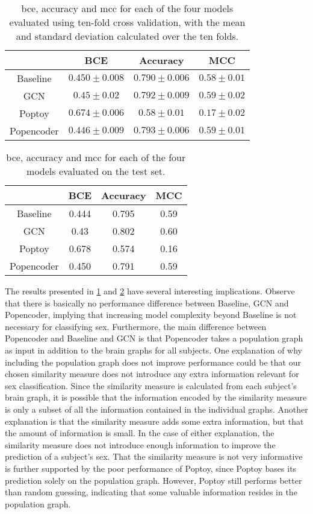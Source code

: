 \begin{table}[!htbp]
    \centering
    \caption{\acrfull{bce}, accuracy and \acrfull{mcc} for each of the four models evaluated using ten-fold cross validation, with the mean and standard deviation calculated over the ten folds.}    
    \begin{tabular}{c|c|c|c}
         & BCE & Accuracy & MCC\\ \hline
        Baseline & $0.450\pm0.008$ & $0.790\pm0.006$ &$0.58\pm 0.01$\\
        GCN &$0.45\pm0.02$ & $0.792\pm0.009$& $0.59\pm0.02$\\
        Poptoy &$0.674\pm 0.006$ & $0.58\pm0.01$ &$0.17\pm0.02$\\
        Popencoder &$0.446\pm0.009$& $0.793\pm 0.006$ & $0.59\pm0.01$\\
    \end{tabular}
    \label{tab:sex_model_results}
\end{table}
\begin{table}[!htbp]
    \centering
    \caption{\acrfull{bce}, accuracy and \acrfull{mcc} for each of the four models evaluated on the test set.}
    \begin{tabular}{c|c|c|c}
         & BCE & Accuracy & MCC\\ \hline
        Baseline & 0.444 & 0.795 &0.59\\
        GCN & 0.43& 0.802 & 0.60 \\
        Poptoy &0.678 &0.574 &0.16\\
        Popencoder & 0.450 & 0.791& 0.59\\
    \end{tabular}
    \label{tab:sex_final_model_results}
\end{table}

The results presented in \cref{tab:sex_model_results} and \cref{tab:sex_final_model_results} have several interesting implications. Observe that there is basically no performance difference between Baseline, GCN and Popencoder, implying that increasing model complexity beyond Baseline is not necessary for classifying sex. Furthermore, the main difference between Popencoder and Baseline and GCN is that Popencoder takes a population graph as input in addition to the brain graphs for all subjects. One explanation of why including the population graph does not improve performance could be that our chosen similarity measure does not introduce any extra information relevant for sex classification. Since the similarity measure is calculated from each subject's brain graph, it is possible that the information encoded by the similarity measure is only a subset of all the information contained in the individual graphs. Another explanation is that the similarity measure adds some extra information, but that the amount of information is small. In the case of either explanation, the similarity measure does not introduce enough information to improve the prediction of a subject's sex. That the similarity measure is not very informative is further supported by the poor performance of Poptoy, since Poptoy bases its prediction solely on the population graph. However, Poptoy still performs better than random guessing, indicating that some valuable information resides in the population graph. 

